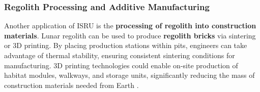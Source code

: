 \subsubsection{Regolith Processing and Additive Manufacturing}

Another application of ISRU is the \textbf{processing of regolith into construction materials}. Lunar regolith can be used to produce \textbf{regolith bricks} via sintering or 3D printing. By placing production stations within pits, engineers can take advantage of thermal stability, ensuring consistent sintering conditions for manufacturing. 3D printing technologies could enable on-site production of habitat modules, walkways, and storage units, significantly reducing the mass of construction materials needed from Earth \cite{bases-feng, jsanders-isru}.
